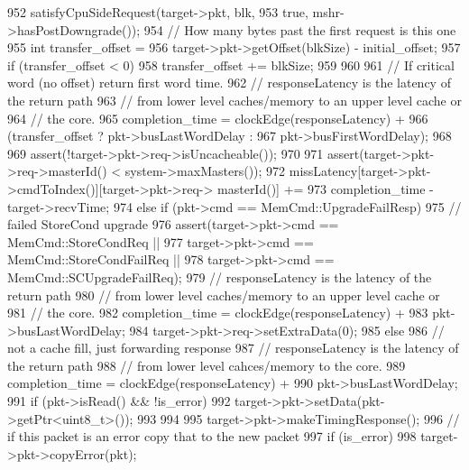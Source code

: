 \begin{DoxyCode}
{{{{952                 satisfyCpuSideRequest(target->pkt, blk,
953                                       true, mshr->hasPostDowngrade());
954                 // How many bytes past the first request is this one
955                 int transfer_offset =
956                     target->pkt->getOffset(blkSize) - initial_offset;
957                 if (transfer_offset < 0) {
958                     transfer_offset += blkSize;
959                 }
960 
961                 // If critical word (no offset) return first word time.
962                 // responseLatency is the latency of the return path
963                 // from lower level caches/memory to an upper level cache or
964                 // the core.
965                 completion_time = clockEdge(responseLatency) +
966                     (transfer_offset ? pkt->busLastWordDelay :
967                      pkt->busFirstWordDelay);
968 
969                 assert(!target->pkt->req->isUncacheable());
970 
971                 assert(target->pkt->req->masterId() < system->maxMasters());
972                 missLatency[target->pkt->cmdToIndex()][target->pkt->req->
      masterId()] +=
973                     completion_time - target->recvTime;
974             } else if (pkt->cmd == MemCmd::UpgradeFailResp) {
975                 // failed StoreCond upgrade
976                 assert(target->pkt->cmd == MemCmd::StoreCondReq ||
977                        target->pkt->cmd == MemCmd::StoreCondFailReq ||
978                        target->pkt->cmd == MemCmd::SCUpgradeFailReq);
979                 // responseLatency is the latency of the return path
980                 // from lower level caches/memory to an upper level cache or
981                 // the core.
982                 completion_time = clockEdge(responseLatency) +
983                     pkt->busLastWordDelay;
984                 target->pkt->req->setExtraData(0);
985             } else {
986                 // not a cache fill, just forwarding response
987                 // responseLatency is the latency of the return path
988                 // from lower level cahces/memory to the core.
989                 completion_time = clockEdge(responseLatency) +
990                     pkt->busLastWordDelay;
991                 if (pkt->isRead() && !is_error) {
992                     target->pkt->setData(pkt->getPtr<uint8_t>());
993                 }
994             }
995             target->pkt->makeTimingResponse();
996             // if this packet is an error copy that to the new packet
997             if (is_error)
998                 target->pkt->copyError(pkt);
}}}
\end{DoxyCode}
